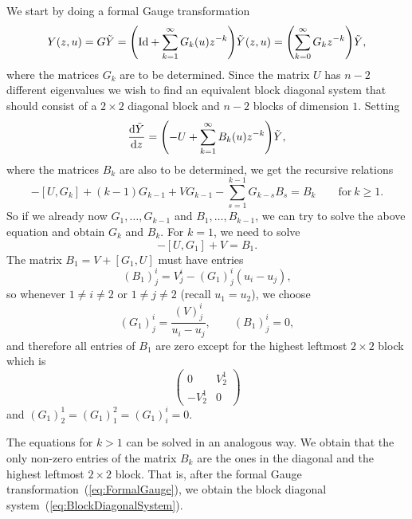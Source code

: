 \documentclass[10pt,a4paper]{amsart}
\numberwithin{equation}{section}
\begin{document}
 We start by doing a formal Gauge transformation
 \begin{equation}
 \label{eq:FormalGauge}
 Y(z,u)=G\tilde{Y}=\Biggl({\rm Id}+\sum_{k=1}^{\infty}G_{k}(u)z^{-k}\Biggr)\tilde{Y}(z,u)=\Biggl(\sum_{k=0}^{\infty}G_{k}z^{-k}\Biggr)\tilde{Y},
 \end{equation}
 where the matrices $G_{k}$ are to be determined. Since the matrix $U$ has $n-2$ different eigenvalues we wish to find an equivalent block diagonal system that should consist of a $2\times 2$ diagonal block and $n-2$ blocks of dimension $1$. Setting
 \begin{equation}
 \label{eq:BlockDiagonalSystem}
 \frac{{\rm d}\tilde{Y}}{{\rm d}z}=\Biggl(-U+\sum_{k=1}^{\infty}B_{k}(u)z^{-k}\Biggr)\tilde{Y},
 \end{equation}
 where the matrices $B_{k}$ are also to be determined, we get the recursive relations
 \begin{equation}
 \label{eq:GRecursiveRelations}
 -[U,G_{k}]+(k-1)G_{k-1}+VG_{k-1}-\sum_{s=1}^{k-1}G_{k-s}B_{s}=B_{k} \qquad\mathrm{for}\ k\geq 1.
 \end{equation}
 So if we already now $G_{1},\dots,G_{k-1}$ and $B_{1},\dots,B_{k-1}$, we can try to solve the above equation and obtain $G_{k}$ and $B_{k}$. For $k=1$, we need to solve
 \begin{equation*}
 -[U,G_{1}]+V=B_{1}.
 \end{equation*}
 The matrix $B_{1}=V+[G_{1},U]$ must have entries
 \begin{equation*}
 (B_{1})^{i}_{j}=V^{i}_{j}-(G_{1})^{i}_{j}(u_{i}-u_{j}),
 \end{equation*}
 so whenever $1\neq i\neq 2$ or $1\neq j\neq 2$ (recall $u_{1}=u_{2}$), we choose
 \begin{equation}
 \label{eq:G1Equation}
 (G_{1})^{i}_{j}=\frac{(V)^{i}_{j}}{u_{i}-u_{j}},\qquad
 (B_{1})^{i}_{j}=0,
 \end{equation}
 and therefore all entries of $B_{1}$ are zero except for the highest leftmost $2\times 2$ block which is
 \begin{equation*}
 \begin{pmatrix}
 0 & V^{1}_{2}\\
 -V^{1}_{2}& 0
 \end{pmatrix}
 \end{equation*}
 and $(G_{1})^{1}_{2}=(G_{1})^{2}_{1}=(G_{1})^{i}_{i}=0$.

 The equations for $k>1$ can be solved in an analogous way. We obtain that the only non-zero entries of the matrix $B_{k}$ are the ones in the diagonal and the highest leftmost $2\times 2$ block. That is, after the formal Gauge transformation~(\ref{eq:FormalGauge}), we obtain the block diagonal system~(\ref{eq:BlockDiagonalSystem}).
\end{document}
